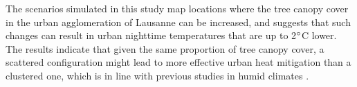 \documentclass[10pt,letterpaper]{article}
\begin{document}
The scenarios simulated in this study map locations where the tree canopy cover in the urban agglomeration of Lausanne can be increased, and suggests that such changes can result in urban nighttime temperatures that are up to 2$\degree$C lower.
The results indicate that given the same proportion of tree canopy cover, a scattered configuration might lead to more effective urban heat mitigation than a clustered one, which is in line with previous studies in humid climates \cite{zhou2011does,kong2014effects,estoque2017effects,zhou2017effects,yu2018strong,nastran2019urban}.
\end{document}
